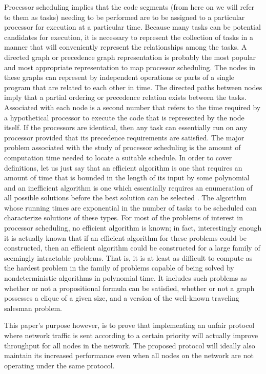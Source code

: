 \documentclass{sigcomm-alternate}
\begin{document}
Processor scheduling implies that the code segments (from here on we will refer to them as tasks) needing to be performed are to be assigned to a particular processor for execution at a particular time. Because many tasks can be potential candidates for execution, it is necessary to represent the collection of tasks in a manner that will conveniently represent the relationships among the tasks. A directed graph or precedence graph representation is probably the most popular and most appropriate representation to map processor scheduling. The nodes in these graphs can represent by independent operations or parts of a single program that are related to each other in time. The directed paths between nodes imply that a partial ordering or precedence relation exists between the tasks. Associated with each node is a second number that refers to the time required by a hypothetical processor to execute the code that is represented by the node itself. If the processors are identical, then any task can essentially run on any processor provided that its precedence requirements are satisfied. 
The major problem associated with the study of processor scheduling is the amount of computation time needed to locate a suitable schedule. In order to cover definitions, let us just say that an efficient algorithm is one that requires an amount of time that is bounded in the length of its input by some polynomial and an inefficient algorithm is one which essentially requires an enumeration of all possible solutions before the best solution can be selected \cite{Gonzalez}. The algorithm whose running times are exponential in the number of tasks to be scheduled can characterize solutions of these types. For most of the problems of interest in processor scheduling, no efficient algorithm is known; in fact, interestingly enough it is actually known that if an efficient algorithm for these problems could be constructed, then an efficient algorithm could be constructed for a large family of seemingly intractable problems. That is, it is at least as difficult to compute as the hardest problem in the family of problems capable of being solved by nondeterministic algorithms in polynomial time. It includes such problems as whether or not a propositional formula can be satisfied, whether or not a graph possesses a clique of a given size, and a version of the well-known traveling salesman problem. 


This paper's purpose however, is to prove that implementing an unfair protocol where network traffic is sent according to a certain priority will actually improve throughput for all nodes in the network. The proposed protocol will ideally also maintain its increased performance even when all nodes on the network are not operating under the same protocol. 
\end{document}
